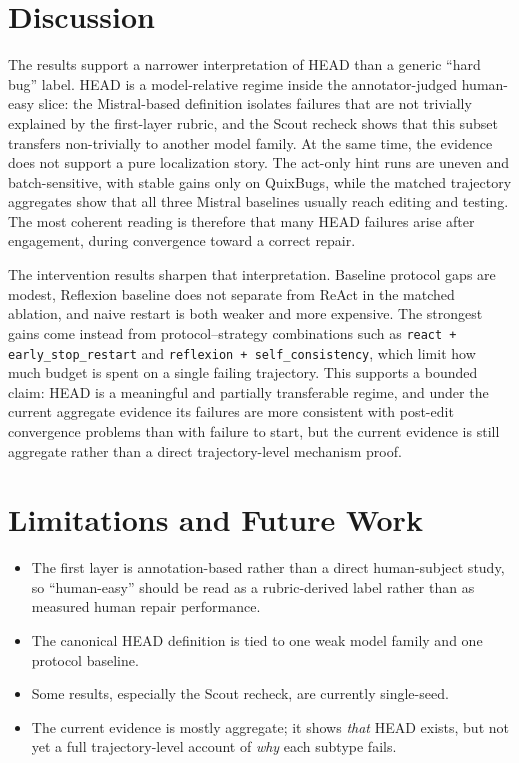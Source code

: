 \documentclass{article}
\begin{document}
\section{Discussion}

The results support a narrower interpretation of HEAD than a generic ``hard bug'' label. HEAD is a model-relative regime inside the annotator-judged human-easy slice: the Mistral-based definition isolates failures that are not trivially explained by the first-layer rubric, and the Scout recheck shows that this subset transfers non-trivially to another model family. At the same time, the evidence does not support a pure localization story. The act-only hint runs are uneven and batch-sensitive, with stable gains only on QuixBugs, while the matched trajectory aggregates show that all three Mistral baselines usually reach editing and testing. The most coherent reading is therefore that many HEAD failures arise after engagement, during convergence toward a correct repair.

The intervention results sharpen that interpretation. Baseline protocol gaps are modest, Reflexion baseline does not separate from ReAct in the matched ablation, and naive restart is both weaker and more expensive. The strongest gains come instead from protocol--strategy combinations such as \texttt{react + early\_stop\_restart} and \texttt{reflexion + self\_consistency}, which limit how much budget is spent on a single failing trajectory. This supports a bounded claim: HEAD is a meaningful and partially transferable regime, and under the current aggregate evidence its failures are more consistent with post-edit convergence problems than with failure to start, but the current evidence is still aggregate rather than a direct trajectory-level mechanism proof.

\section{Limitations and Future Work}

\begin{itemize}
    \item The first layer is annotation-based rather than a direct human-subject study, so ``human-easy'' should be read as a rubric-derived label rather than as measured human repair performance.
    \item The canonical HEAD definition is tied to one weak model family and one protocol baseline.
    \item Some results, especially the Scout recheck, are currently single-seed.
    \item The current evidence is mostly aggregate; it shows \emph{that} HEAD exists, but not yet a full trajectory-level account of \emph{why} each subtype fails.
\end{itemize}
\end{document}
